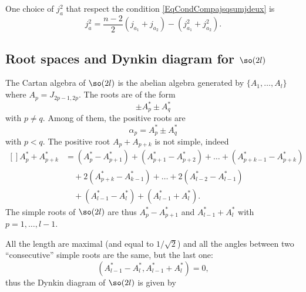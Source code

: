 One choice of $j_a^2$ that respect the condition \eqref{EqCondCompajsqsumjdeux} is
\begin{equation}
	j_a^2=\frac{ n-2 }{2}(j_{a_1}+j_{a_2})-(j_{a_1}^2+j_{a_2}^2).
\end{equation}

\subsection{Root spaces and Dynkin diagram for \texorpdfstring{$\so(2l)$}{so(21)}}

The Cartan algebra of $\so(2l)$ is the abelian algebra generated by $\{ A_1,\ldots,A_l \}$ where $A_p=J_{2p-1,2p}$. The roots are of the form
\begin{equation}
	\pm A_p^*\pm A^*_q
\end{equation}
with $p\neq q$. Among of them, the positive roots are
\begin{equation}
	\alpha_p=A^*_p\pm A^*_q
\end{equation}
with $p<q$. The positive root $A_p+A_{p+k}$ is not simple, indeed
\begin{equation}
	\begin{aligned}[]
		A^*_p+A^*_{p+k}	&= (A^*_p-A^*_{p+1})+(A^*_{p+1}-A^*_{p+2})+\ldots+(A^*_{p+k-1}-A^*_{p+k})\\
		&\quad +2(A^*_{p+k}-A^*_{k-1})+\ldots+2(A^*_{l-2}-A^*_{l-1})\\
		&\quad +(A^*_{l-1}-A^*_l)+(A^*_{l-1}+A^*_l).
	\end{aligned}
\end{equation}
The simple roots of $\so(2l)$ are thus $A^*_p-A^*_{p+1}$ and $A^*_{l-1}+A^*_l$ with $p=1,\ldots,l-1$.

All the length are maximal (and equal to $1/\sqrt{2}$) and all the angles between two ``consecutive'' simple roots are the same, but the last one:
\begin{equation}
	(A^*_{l-1}-A^*_{l},A^*_{l-1}+A^*_{l})=0,
\end{equation}
thus the Dynkin diagram of $\so(2l)$ is given by
\begin{center}
   
\end{center}


